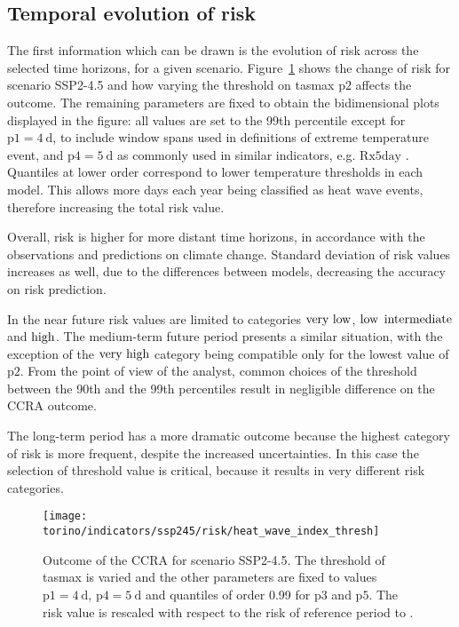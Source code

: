 \subsection{Temporal evolution of risk}
The first information which can be drawn is the evolution of \gls{risk} across the selected time horizons, for a given scenario. Figure~\ref{fig:ssp245_risk_heat_wave_index_thresh-heat_wave_max_length_thresh_tasmax} shows the change of risk for scenario SSP2-4.5 and how varying the threshold on \gls{tasmax} $\mathrm{p2}$ affects the outcome.
The remaining parameters are fixed to obtain the bidimensional plots displayed in the figure: all values are set to the 99th percentile except for $\mathrm{p1} = \qty{4}{\day}$, to include window spans used in definitions of extreme temperature event, and $\mathrm{p4} = \qty{5}{\day}$ as commonly used in similar indicators, e.g. $\mathrm{Rx5day}$ \cite[2208]{2021GutierrezAnnexVI}.
Quantiles at lower order correspond to lower temperature thresholds in each model. This allows more days each year being classified as heat wave events, therefore increasing the total risk value.

Overall, risk is higher for more distant time horizons, in accordance with the observations and predictions on climate change. Standard deviation of risk values increases as well, due to the differences between models, decreasing the accuracy on risk prediction.

In the near future risk values are limited to categories $\text{very low}$, $\text{low}$ $\text{intermediate}$ and $\text{high}$. The medium-term future period presents a similar situation, with the exception of the $\text{very high}$ category being compatible only for the lowest value of $\mathrm{p2}$. From the point of view of the analyst, common choices of the threshold between the 90th and the 99th percentiles result in negligible difference on the \gls{CCRA} outcome.

The long-term period has a more dramatic outcome because the highest category of risk is more frequent, despite the increased uncertainties. In this case the selection of threshold value is critical, because it results in very different risk categories.

\begin{figure}[h]
  \centering
  \texttt{[image: torino/indicators/ssp245/risk/heat\_wave\_index\_thresh]}
  \caption{Outcome of the \gls{CCRA} for scenario SSP2-4.5. The threshold of \gls{tasmax} is varied and the other parameters are fixed to values $\mathrm{p1} = \qty{4}{\day}$, $\mathrm{p4} = \qty{5}{\day}$ and quantiles of order 0.99 for $\mathrm{p3}$ and $\mathrm{p5}$. The risk value is rescaled with respect to the risk of reference period  to .}
  \label{fig:ssp245_risk_heat_wave_index_thresh-heat_wave_max_length_thresh_tasmax}
\end{figure}

